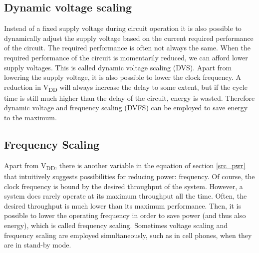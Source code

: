  \subsection{Dynamic voltage scaling}
 Instead of a fixed supply voltage during circuit operation it is also possible to dynamically 
 adjust the supply voltage based on the current required performance of the circuit. The 
 required performance is often not always the same. When the required performance 
 of the circuit is momentarily reduced, we can afford lower supply voltages. This is 
 called dynamic voltage scaling (DVS). Apart from lowering the supply 
 voltage, it is also possible to lower the clock frequency. A reduction in V\textsubscript{DD} will always 
 increase the delay to some extent, but if the cycle time is still much higher than the delay 
 of the circuit, energy is wasted. Therefore dynamic voltage and frequency scaling 
 (DVFS) can be employed to save energy to the maximum.
 
 \subsection{Frequency Scaling}
 Apart from V\textsubscript{DD}, there is another variable in the equation of section \ref{src_pwr} that intuitively 
 suggests possibilities for reducing power: frequency. Of course, the clock frequency is 
 bound by the desired throughput of the system. However, a system does rarely operate at 
 its maximum throughput all the time. Often, the desired throughput is much lower than 
 its maximum performance. Then, it is possible to lower the operating frequency in order 
 to save power (and thus also energy), which is called frequency scaling. Sometimes 
 voltage scaling and frequency scaling are employed simultaneously, such as in cell phones, 
 when they are in stand-by mode.
 
